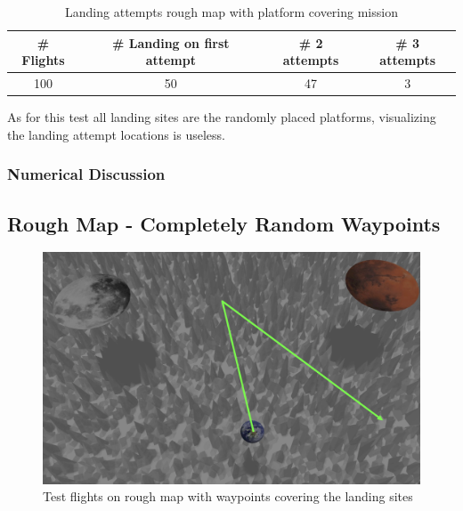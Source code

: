        \begin{table}[h]
            \begin{center}
             \caption{Landing attempts rough map with platform covering mission}\vspace{1ex}
             \label{tab:land_nums_rough_coverage}
             \begin{tabular}{|c|c|c|c|}
             \hline
             \# Flights & \# Landing on first attempt & \# 2 attempts & \# 3 attempts\\ \hline \hline
             100 & 50 & 47 & 3 \\%
             \hline
             \end{tabular}
            \end{center}
        \end{table}

        As for this test all landing sites are the randomly placed platforms, visualizing the landing attempt locations is useless.

        \subsubsection{Numerical Discussion}

\subsection{Rough Map - Completely Random Waypoints}

    \begin{figure}[h]
        \centering
        \includegraphics[scale=0.24]{images/evaluation/rough_complete_rand.png}
        \caption{Test flights on rough map with waypoints covering the landing sites}
        \label{fig:rough_compl_rand}
    \end{figure}

